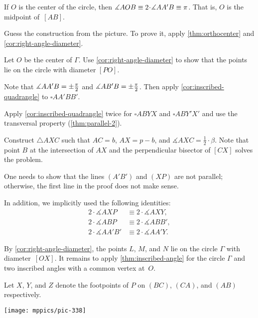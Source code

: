 If $O$ is the center of the circle, then 
$\measuredangle AOB\z\equiv 2\cdot \measuredangle AA'B\equiv\pi$.
That is, $O$ is the midpoint of~$[AB]$.

Guess the construction from the picture.
To prove it,
apply \ref{thm:orthocenter} and \ref{cor:right-angle-diameter}.

Let $O$ be the center of $\Gamma$.
Use \ref{cor:right-angle-diameter} to show that the points lie on the circle with diameter $[PO]$.

Note that $\measuredangle AA'B=\pm\tfrac\pi2$ and $\measuredangle AB'B=\pm\tfrac\pi2$.
Then apply \ref{cor:inscribed-quadrangle}
to $\square AA'BB'$.

Apply \ref{cor:inscribed-quadrangle} twice for $\square ABYX$ and $\square ABY'X'$ and use the transversal property (\ref{thm:parallel-2}).

Construct $\triangle AXC$ such that $AC=b$, $AX=p-b$, and $\measuredangle AXC=\tfrac12\cdot \beta$.
Note that point $B$ at the intersection of $AX$ and the perpendicular bisector of $[CX]$ solves the problem. 


One needs to show that the lines $(A'B')$ and $(XP)$ are not parallel; otherwise, the first line in the proof does not make sense.



In addition, we implicitly used the following identities:
\begin{align*}
2\cdot \measuredangle AXP&\equiv2\cdot \measuredangle AXY,
\\
2\cdot \measuredangle ABP&\equiv2\cdot \measuredangle ABB',
\\
2\cdot \measuredangle AA'B'&\equiv2\cdot \measuredangle AA'Y.
\end{align*}

By \ref{cor:right-angle-diameter},
the points $L$, $M$, and $N$ lie on the circle $\Gamma$ with diameter~$[OX]$.
It remains to apply \ref{thm:inscribed-angle} for the circle $\Gamma$ 
and two inscribed angles with a common vertex at~$O$.

Let $X$, $Y$, and $Z$ denote the footpoints of $P$ on $(BC)$, $(CA)$, and $(AB)$ respectively.

\begin{Figure}
\centering
\texttt{[image: mppics/pic-338]}
\end{Figure}

